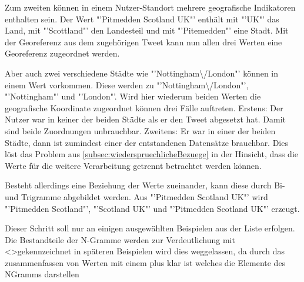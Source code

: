 				Zum zweiten können in einem Nutzer-Standort mehrere geografische Indikatoren enthalten sein.  
				Der Wert "'Pitmedden Scotland UK"' enthält mit "'UK"' das Land, mit "'Scottland"' den Landesteil und mit "'Pitemedden"' eine Stadt. 
				Mit der Georeferenz aus dem zugehörigen Tweet kann nun allen drei Werten eine Georeferenz zugeordnet werden.

				Aber auch zwei verschiedene Städte wie "'Nottingham\textbackslash/London"' können in einem Wert vorkommen.
				Diese werden zu "'Nottingham\textbackslash/London"', "'Nottingham"' und "'London"'.
				Wird hier wiederum beiden Werten die geografische Koordinate zugeordnet können drei Fälle auftreten.
				Erstens: Der Nutzer war in keiner der beiden Städte als er den Tweet abgesetzt hat. 
				Damit sind beide Zuordnungen unbrauchbar.
				Zweitens: Er war in einer der beiden Städte, dann ist zumindest einer der entstandenen Datensätze brauchbar.
				Dies löst das Problem aus \ref{subsec:wiederspruechlicheBezuege} in der Hinsicht, dass die Werte für die weitere Verarbeitung getrennt betrachtet werden können.

				Besteht allerdings eine Beziehung der Werte zueinander, kann diese durch Bi- und Trigramme abgebildet werden.
				Aus "'Pitmedden Scotland UK"' wird "'Pitmedden Scotland"', "'Scotland UK"' und "'Pitmedden Scotland UK"' erzeugt.

				Dieser Schritt soll nur an einigen ausgewählten Beispielen aus der Liste erfolgen.
				Die Bestandteile der N-Gramme werden zur Verdeutlichung mit \textless \textgreater gekennzeichnet in späteren Beispielen wird dies weggelassen, da durch das zusammenfassen von Werten mit einem plus klar ist welches die Elemente des NGramms darstellen


